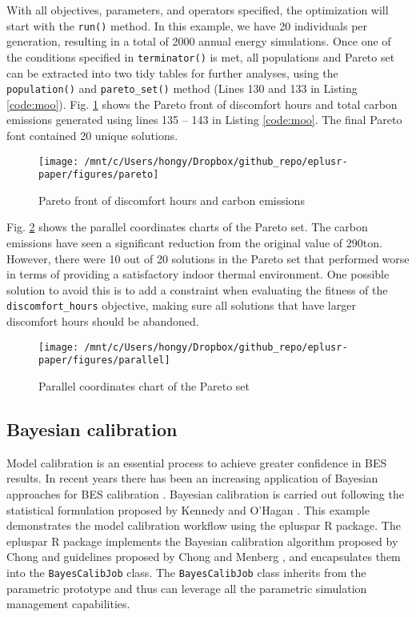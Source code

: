 \documentclass[3p, times]{elsarticle} %
\begin{document}
With all objectives, parameters, and operators specified, the optimization will
start with the \texttt{run()} method.
In this example, we have 20 individuals per generation, resulting in a
total of 2000 annual energy simulations.
Once one of the conditions specified in \texttt{terminator()} is met, all populations
and Pareto set can be extracted into two tidy tables for further analyses,
using the \texttt{population()} and \texttt{pareto\_set()} method (Lines 130 and 133 in Listing
\ref{code:moo}).
Fig. \ref{fig:pareto} shows the Pareto front of discomfort hours and total
carbon emissions generated using lines 135 -- 143 in Listing \ref{code:moo}.
The final Pareto font contained 20 unique solutions.

\begin{figure}[!htb]
\texttt{[image: /mnt/c/Users/hongy/Dropbox/github\_repo/eplusr-paper/figures/pareto]} \caption{Pareto front of discomfort hours and carbon emissions}\label{fig:pareto}
\end{figure}

Fig. \ref{fig:parallel} shows the parallel coordinates charts of the Pareto
set. The carbon emissions have seen a significant reduction from the original
value of 290ton. However, there were 10 out of 20 solutions in the Pareto set
that performed worse in terms of providing a satisfactory indoor thermal
environment. One possible solution to avoid this is to add a constraint when
evaluating the fitness of the \texttt{discomfort\_hours} objective, making sure all
solutions that have larger discomfort hours should be abandoned.

\begin{figure}[!htb]
\texttt{[image: /mnt/c/Users/hongy/Dropbox/github\_repo/eplusr-paper/figures/parallel]} \caption{Parallel coordinates chart of the Pareto set}\label{fig:parallel}
\end{figure}

\hypertarget{bayesian-calibration}{%
\subsection{Bayesian calibration}\label{bayesian-calibration}}

Model calibration is an essential process to achieve greater confidence in BES
results. In recent years there has been an increasing application of Bayesian
approaches for BES calibration \citep{Chong2017, Tian2016Identifying, Yi2019Parameter}. Bayesian calibration is carried
out following the statistical formulation proposed by Kennedy and O'Hagan
\citep{Chong2018}. This example demonstrates the model calibration workflow
using the epluspar R package. The epluspar R package implements the Bayesian
calibration algorithm proposed by Chong \citep{Chong2017} and guidelines proposed by
Chong and Menberg \citep{Chong2018}, and encapsulates them into the \texttt{BayesCalibJob}
class.
The \texttt{BayesCalibJob} class inherits from the parametric prototype and thus can
leverage all the parametric simulation management capabilities.
\end{document}
